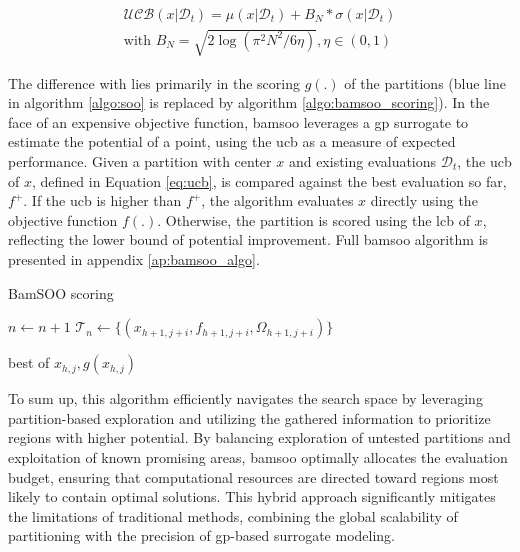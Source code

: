 \begin{equation}
    \begin{split}
    \mathcal{UCB}(x| \mathcal D_t) = \mu(x|\mathcal D_t) +  B_N * \sigma(x|\mathcal D_t) 
    \\ \text{with } B_N = \sqrt{2 \log (\pi^2 N^2/6 \eta)} , \eta \in (0,1)      
    \end{split}  
    \label{eq:ucb}
\end{equation}

The difference with lies primarily in the scoring $g(.)$ of the partitions (blue line in algorithm \ref{algo:soo} is replaced by algorithm \ref{algo:bamsoo_scoring}). In the face of an expensive objective function, \acrshort{bamsoo} leverages a \acrshort{gp} surrogate to estimate the potential of a point, using the \acrshort{ucb} as a measure of expected performance. Given a partition with center $x$ and existing evaluations $\mathcal{D}_t$, the \acrshort{ucb} of $x$, defined in Equation \ref{eq:ucb}, is compared against the best evaluation so far, $f^+$. If the \acrshort{ucb} is higher than $f^+$, the algorithm evaluates $x$ directly using the objective function $f(.)$. Otherwise, the partition is scored using the \acrshort{lcb} of $x$, reflecting the lower bound of potential improvement. Full \acrshort{bamsoo} algorithm is presented in appendix \ref{ap:bamsoo_algo}.


\begin{algorithm}[h]
    \caption{BamSOO scoring}
    \label{algo:bamsoo_scoring}    
    
                    $n \gets n+1$ \;
                    $\mathcal{T}_n \gets \{(x_{h+1,j+i}, f_{h+1,j+i}, \Omega_{h+1,j+i})\}$ \;
                
    \Return best of $x_{h,j}, g(x_{h,j})$ \;
    \end{algorithm}

To sum up, this algorithm efficiently navigates the search space by leveraging partition-based exploration and utilizing the gathered information to prioritize regions with higher potential. By balancing exploration of untested partitions and exploitation of known promising areas, \acrshort{bamsoo} optimally allocates the evaluation budget, ensuring that computational resources are directed toward regions most likely to contain optimal solutions. This hybrid approach significantly mitigates the limitations of traditional methods, combining the global scalability of partitioning with the precision of \acrshort{gp}-based surrogate modeling.

